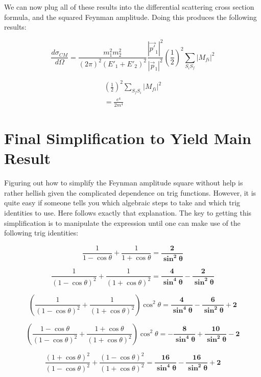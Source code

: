 \documentclass[a4]{article}
\begin{document}
    We can now plug all of these results into the differential scattering cross section formula, and the squared Feynman amplitude. Doing this produces the following results:

    \begin{equation}
        \frac{d \sigma_{CM}}{d \Omega} = \frac{m_1^2 m_2^2}{(2 \pi)^2 (E'_1 + E'_2)^2} \frac{|\vec{p'}_1|^2}{|\vec{p}_1|^2} (\frac{1}{2})^2 \sum_{S_i S_f} |M_{fi}|^2
    \end{equation}

    \begin{eqnarray}
        (\frac{1}{2})^2 \sum_{S_f S_i} |M_{f i}|^2 \\
        = \frac{e^4}{2 m^4}
    \end{eqnarray}

    \section*{Final Simplification to Yield Main Result}

    Figuring out how to simplify the Feynman amplitude square without help is rather hellish given the complicated dependence on trig functions. However, it is quite easy if someone tells you which algebraic steps to take and which trig identities
    to use. Here follows exactly that explanation. The key to getting this simplification is to manipulate the expression until one can make use of the following trig identities:

    \begin{framed}

        \begin{equation}
            \frac{1}{1 - \cos \theta} + \frac{1}{1 + \cos \theta} = \mathbf{\frac{2}{\sin^2 \theta}}
        \end{equation}

        \begin{equation}
            \frac{1}{(1 - \cos \theta)^2} + \frac{1}{(1 + \cos \theta)^2} = \mathbf{\frac{4}{\sin^4 \theta} - \frac{2}{\sin^2 \theta}}
        \end{equation}

        \begin{equation}
            (\frac{1}{(1 - \cos \theta)^2} + \frac{1}{(1 + \cos \theta)^2}) \cos^2 \theta = \mathbf{\frac{4}{\sin^4 \theta} - \frac{6}{\sin^2 \theta} + 2}
        \end{equation}
 
        \begin{equation}
            (\frac{1 - \cos \theta}{(1 - \cos \theta)^2} + \frac{1 + \cos \theta}{(1 + \cos \theta)^2}) \cos^2 \theta = \mathbf{- \frac{8}{\sin^4 \theta} + \frac{10}{\sin^2 \theta} - 2}
        \end{equation}

        \begin{equation}
            \frac{(1 + \cos \theta)^2}{(1 - \cos \theta)^2} + \frac{(1 - \cos \theta)^2}{(1 + \cos \theta)^2} = \mathbf{\frac{16}{\sin^4 \theta} - \frac{16}{\sin^2 \theta} + 2}
        \end{equation}

    \end{framed}
\end{document}
